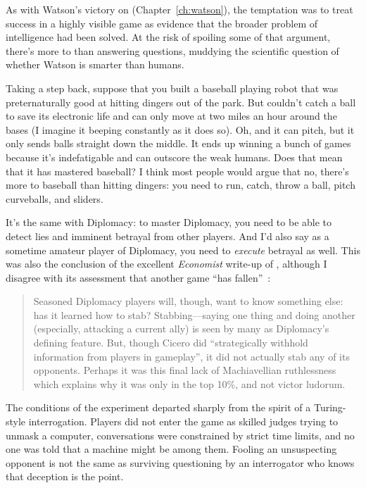 As with  Watson’s victory on \jeopardy{}
(Chapter~\ref{ch:watson}), the temptation was to treat success in a
highly visible game as evidence that the broader problem of
intelligence had been solved.
%
At the risk of spoiling some of that argument, there's more to
\jeopardy{} than answering questions, muddying the scientific
question of whether Watson is smarter than humans.

Taking a step back, suppose that you built a baseball playing robot
that was preternaturally good at hitting dingers out of the park.
%
But
couldn’t catch a ball to save its electronic life and can only move at
two miles an hour around the bases (I imagine it beeping constantly as
it does so).
%
Oh, and it can pitch, but it only sends balls straight
down the middle.
%
It ends up winning a bunch of games because it's
indefatigable and can outscore the weak humans.
%
Does that mean that it has mastered baseball?
%
I think most people would argue that no, there’s more to baseball than
hitting dingers: you need to run, catch, throw a ball, pitch curveballs,
and sliders.

It’s the same with Diplomacy: to master Diplomacy, you need to be able to
detect lies and imminent betrayal from other players.
%
And I’d also say as a sometime amateur player of Diplomacy, you need to
\emph{execute} betrayal as well.
%
This was also the conclusion of the excellent \textit{Economist} write-up
of , although I disagree with its assessment that another game
``has fallen''~\citep{economist2022cicero}:
\begin{quote}
Seasoned Diplomacy players will, though, want to know something else: has it
learned how to stab? Stabbing—saying one thing and doing another (especially, attacking a current ally) is seen by many as Diplomacy’s defining feature. But, though Cicero did ``strategically withhold information from players in gameplay'', it did not actually stab any of its opponents. Perhaps it was this final lack of Machiavellian ruthlessness which explains why it was only in the top 10\%, and not victor ludorum.
\end{quote}

The conditions of the experiment departed sharply from the
spirit of a Turing-style interrogation.
%
Players did not enter the game as skilled judges trying to unmask a
computer, conversations were constrained by strict time limits, and no one
was told that a machine might be among them.
%
Fooling an unsuspecting opponent is not the same as surviving
questioning by an interrogator who knows that deception is the point.

